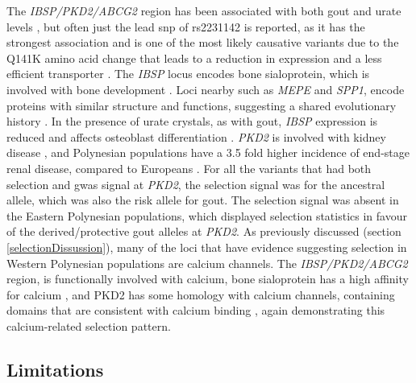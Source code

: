 \documentclass[]{report}
\begin{document}
The \emph{IBSP/PKD2/ABCG2} region has been associated with both gout and
urate levels \citep{Yang2010}, but often just the lead \gls{snp} of
rs2231142 is reported, as it has the strongest association and is one of
the most likely causative variants due to the Q141K amino acid change
that leads to a reduction in expression and a less efficient transporter
\citep{Woodward2009}. The \emph{IBSP} locus encodes bone sialoprotein,
which is involved with bone development \citep{Kerr1993}. Loci nearby
such as \emph{MEPE} and \emph{SPP1}, encode proteins with similar
structure and functions, suggesting a shared evolutionary history
\citep{Rowe2000}. In the presence of urate crystals, as with gout,
\emph{IBSP} expression is reduced and affects osteoblast differentiation
\citep{Chhana2011}. \emph{PKD2} is involved with kidney disease
\citep{Mochizuki1996, Hildebrandt2010}, and Polynesian populations have
a 3.5 fold higher incidence of end-stage renal disease, compared to
Europeans \citep{Collins2017book}. For all the variants that had both
selection and \gls{gwas} signal at \emph{PKD2}, the selection signal was
for the ancestral allele, which was also the risk allele for gout. The
selection signal was absent in the Eastern Polynesian populations, which
displayed selection statistics in favour of the derived/protective gout
alleles at \emph{PKD2}. As previously discussed (section
\ref{selectionDissussion}), many of the loci that have evidence
suggesting selection in Western Polynesian populations are calcium
channels. The \emph{IBSP/PKD2/ABCG2} region, is functionally involved
with calcium, bone sialoprotein has a high affinity for calcium
\citep{Kerr1993}, and PKD2 has some homology with calcium channels,
containing domains that are consistent with calcium binding
\citep{Mochizuki1996}, again demonstrating this calcium-related
selection pattern.

\subsection{Limitations}\label{limitations}
\end{document}
